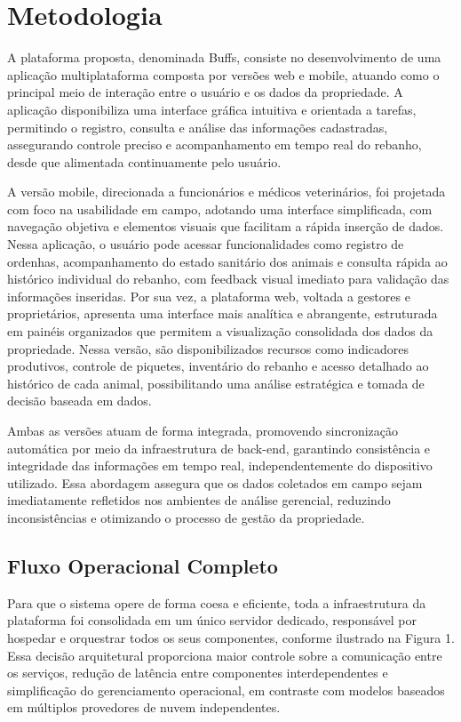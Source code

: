 \documentclass[11pt,a4paper]{article}
\begin{document}

\section{Metodologia}

A plataforma proposta, denominada Buffs, consiste no desenvolvimento de uma aplicação multiplataforma composta por versões web e mobile, atuando como o principal meio de interação entre o usuário e os dados da propriedade. A aplicação disponibiliza uma interface gráfica intuitiva e orientada a tarefas, permitindo o registro, consulta e análise das informações cadastradas, assegurando controle preciso e acompanhamento em tempo real do rebanho, desde que alimentada continuamente pelo usuário.

A versão mobile, direcionada a funcionários e médicos veterinários, foi projetada com foco na usabilidade em campo, adotando uma interface simplificada, com navegação objetiva e elementos visuais que facilitam a rápida inserção de dados. Nessa aplicação, o usuário pode acessar funcionalidades como registro de ordenhas, acompanhamento do estado sanitário dos animais e consulta rápida ao histórico individual do rebanho, com feedback visual imediato para validação das informações inseridas. Por sua vez, a plataforma web, voltada a gestores e proprietários, apresenta uma interface mais analítica e abrangente, estruturada em painéis organizados que permitem a visualização consolidada dos dados da propriedade. Nessa versão, são disponibilizados recursos como indicadores produtivos, controle de piquetes, inventário do rebanho e acesso detalhado ao histórico de cada animal, possibilitando uma análise estratégica e tomada de decisão baseada em dados.

Ambas as versões atuam de forma integrada, promovendo sincronização automática por meio da infraestrutura de back-end, garantindo consistência e integridade das informações em tempo real, independentemente do dispositivo utilizado. Essa abordagem assegura que os dados coletados em campo sejam imediatamente refletidos nos ambientes de análise gerencial, reduzindo inconsistências e otimizando o processo de gestão da propriedade.

\subsection{Fluxo Operacional Completo}

Para que o sistema opere de forma coesa e eficiente, toda a infraestrutura da plataforma foi consolidada em um único servidor dedicado, responsável por hospedar e orquestrar todos os seus componentes, conforme ilustrado na Figura 1. Essa decisão arquitetural proporciona maior controle sobre a comunicação entre os serviços, redução de latência entre componentes interdependentes e simplificação do gerenciamento operacional, em contraste com modelos baseados em múltiplos provedores de nuvem independentes.
\end{document}
